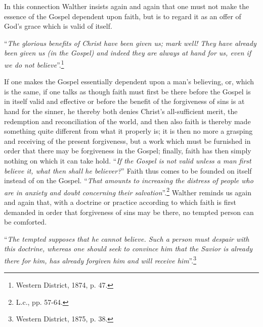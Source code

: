                 In this connection Walther insists again and again that one must not make the essence of the Gospel dependent upon faith, but is to regard it as an offer of God’s grace which is valid of itself.  \begin{displayquote}“\textit{The glorious benefits of Christ have been given us; mark well! They have already been given us (in the Gospel) and indeed they are always at hand for us, even if we do not believe}”.\footnote{Western District, 1874, p. 47.}\end{displayquote}  If one makes the Gospel essentially dependent upon a man’s believing, or, which is the same, if one talks as though faith must first be there before the Gospel is in itself valid and effective or before the benefit of the forgiveness of sins is at hand for the sinner, he thereby both denies Christ’s all-sufficient merit, the redemption and reconciliation of the world, and then also faith is thereby made something quite different from what it properly is; it is then no more a grasping and receiving of the present forgiveness, but a work which must be furnished in order that there may be forgiveness in the Gospel; finally, faith has then simply nothing on which it can take hold.  “\textit{If the Gospel is not valid unless a man first believe it, what then shall he believer?}”  Faith thus comes to be founded on itself instead of on the Gospel.  “\textit{That amounts to increasing the distress of people who are in anxiety and doubt concerning their salvation}”.\footnote{L.c., pp. 57-64.} Walther reminds us again and again that, with a doctrine or practice according to which faith is first demanded in order that forgiveness of sins may be there, no tempted person can be comforted.  \begin{displayquote}``\textit{The tempted supposes that he cannot believe.  Such a person must despair with this doctrine, whereas one should seek to convince him that the Savior is already there for him, has already forgiven him and will receive him}”.\footnote{Western District, 1875, p. 38.}\end{displayquote}

